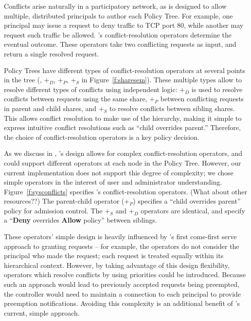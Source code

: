 Conflicts arise naturally in a participatory network, as \sys is
designed to allow multiple, distributed principals to author each Policy Tree.
For example, one principal may issue a request to deny traffic to
TCP port 80, while another may request  such traffic be allowed. \sys's
conflict-resolution operators determine the eventual outcome. These
operators take two conflicting requests as input, and return a single
resolved request.

Policy Trees have different types of conflict-resolution operators at several
points in the tree (\ie, $+_D$, $+_P$, $+_S$ in Figure~\ref{f:sharesem}). 
These multiple types allow \sys to resolve different types of conflicts using
independent logic: $+_D$ is used to resolve conflicts between requests
using the same share, $+_P$ between conflicting requests in parent and
child shares, and $+_S$ to resolve conflicts between sibling shares.
This allows conflict resolution to make use of the hierarchy, making it
simple to express intuitive conflict resolutions such as ``child overrides
parent.''
Therefore, the choice of conflict-resolution operators is a key policy decision.

As we discuss in , \sys's design allows for complex
conflict-resolution operators, and could support different operators at
each node in the Policy Tree. However, our current implementation does
not support this degree of complexity; we chose simple operators in the
interest of user and administrator understanding.
Figure~\ref{f:sysconflicts} specifies \sys's conflict-resolution
operators. {\color{red}(What about other resources??)}
The parent-child operator ($+_P$) specifies a ``child
overrides parent'' policy for admission control. The $+_S$ and $+_D$
operators are identical, and specify a ``\textbf{Deny} overrides
\textbf{Allow} policy'' between siblings.

These operators' simple design is heavily influenced by \sys's
first come-first serve approach to granting requests -- for example,
the operators do not consider the principal who made the request;
each request is treated equally within its hierarchical context.
However, by taking advantage of this design flexibility, operators
which resolve conflicts by using priorities could be introduced.
Because such an approach would lead to previously accepted requests
being preempted, the \sys controller would need to maintain a
connection to each principal to provide preemption notifications.
Avoiding this complexity is an additional benefit of \sys's current,
simple approach.



